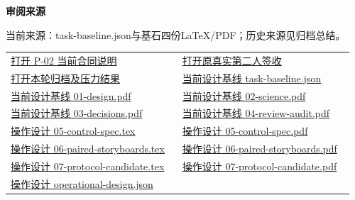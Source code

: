\documentclass[11pt,a4paper]{article}
\newcommand{\reviewsubsection}[1]{\par\Needspace{4\baselineskip}\vspace{4pt}\begin{center}{\titlelatin\titlecjk\bfseries\fontsize{12}{18}\selectfont #1}\end{center}}
\begin{document}
\begin{minipage}{\linewidth}
\reviewsubsection{3.4 审阅来源}
当前来源：task-\allowbreak{}baseline.json与基石四份LaTeX/\allowbreak{}PDF；历史来源见归档总结。


\begingroup\small\setlength{\tabcolsep}{4pt}\begin{tabular}{@{}p{0.48\linewidth}p{0.48\linewidth}@{}}
\href{file:///D:/Agent/srp/agent/tasks/P-02/outputs/current-store-contract.md}{打开 P-\allowbreak{}02 当前合同说明} & \href{file:///D:/Agent/srp/agent/modules/srp_session_store/P-02_\%E7\%AC\%AC\%E4\%BA\%8C\%E4\%BA\%BA\%E5\%AE\%A1\%E6\%A0\%B8\%E6\%8A\%A5\%E5\%91\%8A_\%E5\%B7\%B2\%E7\%AD\%BE\%E7\%BD\%B2.md}{打开原真实第二人签收}\\[4pt]
\href{file:///D:/Agent/srp/agent/tasks/P-02/evidence/verification.json}{打开本轮归档及压力结果} & \href{file:///D:/Agent/srp/agent/design/design-foundation-20261008/task-baseline.json}{当前设计基线 task-\allowbreak{}baseline.json}\\[4pt]
\href{file:///D:/Agent/srp/agent/design/design-foundation-20261008/01-design.pdf}{当前设计基线 01-\allowbreak{}design.pdf} & \href{file:///D:/Agent/srp/agent/design/design-foundation-20261008/02-science.pdf}{当前设计基线 02-\allowbreak{}science.pdf}\\[4pt]
\href{file:///D:/Agent/srp/agent/design/design-foundation-20261008/03-decisions.pdf}{当前设计基线 03-\allowbreak{}decisions.pdf} & \href{file:///D:/Agent/srp/agent/design/design-foundation-20261008/04-review-audit.pdf}{当前设计基线 04-\allowbreak{}review-\allowbreak{}audit.pdf}\\[4pt]
\href{file:///D:/Agent/srp/agent/design/design-foundation-20261008/05-control-spec.tex}{操作设计 05-\allowbreak{}control-\allowbreak{}spec.tex} & \href{file:///D:/Agent/srp/agent/design/design-foundation-20261008/05-control-spec.pdf}{操作设计 05-\allowbreak{}control-\allowbreak{}spec.pdf}\\[4pt]
\href{file:///D:/Agent/srp/agent/design/design-foundation-20261008/06-paired-storyboards.tex}{操作设计 06-\allowbreak{}paired-\allowbreak{}storyboards.tex} & \href{file:///D:/Agent/srp/agent/design/design-foundation-20261008/06-paired-storyboards.pdf}{操作设计 06-\allowbreak{}paired-\allowbreak{}storyboards.pdf}\\[4pt]
\href{file:///D:/Agent/srp/agent/design/design-foundation-20261008/07-protocol-candidate.tex}{操作设计 07-\allowbreak{}protocol-\allowbreak{}candidate.tex} & \href{file:///D:/Agent/srp/agent/design/design-foundation-20261008/07-protocol-candidate.pdf}{操作设计 07-\allowbreak{}protocol-\allowbreak{}candidate.pdf}\\[4pt]
\href{file:///D:/Agent/srp/agent/design/design-foundation-20261008/operational-design.json}{操作设计 operational-\allowbreak{}design.json} & \\[4pt]
\end{tabular}\endgroup\end{minipage}\par
\end{document}
